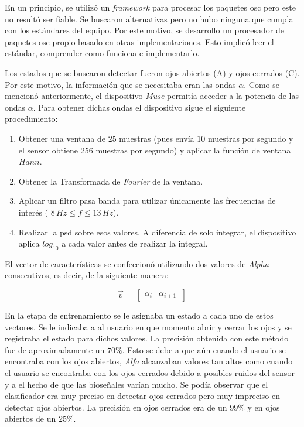 En un principio, se utilizó un \emph{framework} para procesar los paquetes \acrshort{osc} pero este no resultó ser fiable. Se buscaron alternativas pero no hubo ninguna que cumpla con los estándares del equipo. Por este motivo, se desarrollo un procesador de paquetes \acrshort{osc} propio basado en otras implementaciones. Esto implicó leer el estándar, comprender como funciona e implementarlo.
 
 Los estados que se buscaron detectar fueron ojos abiertos (A) y ojos cerrados (C). Por este motivo, la información que se necesitaba eran las ondas $\alpha$. Como se mencionó anteriormente, el dispositivo \emph{Muse} permitía acceder a la potencia de las ondas $\alpha$. Para obtener dichas ondas el dispositivo sigue el siguiente procedimiento:
 
 \begin{enumerate}
 \item Obtener una ventana de $25$ muestras (pues envía $10$ muestras por segundo y el sensor obtiene $256$ muestras por segundo) y aplicar la función de ventana $Hann$.
 \item Obtener la Transformada de \emph{Fourier} de la ventana.
 \item Aplicar un filtro pasa banda para utilizar únicamente las frecuencias de interés ( $ 8 \, Hz \leq f \leq 13 \, Hz$).
 \item Realizar la \acrshort{psd} sobre esos valores. A diferencia de solo integrar, el dispositivo aplica $log_{10}$  a cada valor antes de realizar la integral.
 \end{enumerate}

El vector de características se confeccionó utilizando dos valores de \emph{Alpha} consecutivos, es decir, de la siguiente manera:

\[
  \vec{v}^{\, }=
  \left[ {\begin{array}{cc}
   \alpha_{i}  & \alpha_{i + 1}  \     \end{array} } \right]
\]

En la etapa de entrenamiento se le asignaba un estado a cada uno de estos vectores. Se le indicaba a al usuario en que momento abrir y cerrar los ojos y se registraba el estado para dichos valores. La precisión obtenida con este método fue de aproximadamente un $70\%$. Esto se debe a que aún cuando el usuario se encontraba con los ojos abiertos, \emph{Alfa} alcanzaban valores tan altos como cuando el usuario se encontraba con los ojos cerrados debido a posibles ruidos del sensor y a el hecho de que las bioseñales varían mucho. Se podía observar que el clasificador era muy preciso en detectar ojos cerrados pero muy impreciso en detectar ojos abiertos. La precisión en ojos cerrados era de un $99\%$ y en ojos abiertos de un $25\%$.

